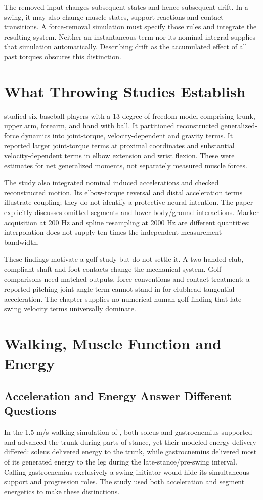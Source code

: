 The removed input changes subsequent states and hence subsequent drift. In a swing, it may also change muscle states, support reactions and contact transitions. A force-removal simulation must specify those rules and integrate the resulting system. Neither an instantaneous term nor its nominal integral supplies that simulation automatically. Describing drift as the accumulated effect of all past torques obscures this distinction.

\section{What Throwing Studies Establish}
\label{sec:throwing_lessons}
\citep{Hirashima2008kinetic} studied six baseball players with a 13-degree-of-freedom model comprising trunk, upper arm, forearm, and hand with ball. It partitioned reconstructed generalized-force dynamics into joint-torque, velocity-dependent and gravity terms. It reported larger joint-torque terms at proximal coordinates and substantial velocity-dependent terms in elbow extension and wrist flexion. These were estimates for net generalized moments, not separately measured muscle forces.

The study also integrated nominal induced accelerations and checked reconstructed motion. Its elbow-torque reversal and distal acceleration terms illustrate coupling; they do not identify a protective neural intention. The paper explicitly discusses omitted segments and lower-body/ground interactions. Marker acquisition at 200 Hz and spline resampling at 2000 Hz are different quantities: interpolation does not supply ten times the independent measurement bandwidth.

These findings motivate a golf study but do not settle it. A two-handed club, compliant shaft and foot contacts change the mechanical system. Golf comparisons need matched outputs, force conventions and contact treatment; a reported pitching joint-angle term cannot stand in for clubhead tangential acceleration. The chapter supplies no numerical human-golf finding that late-swing velocity terms universally dominate.

\section{Walking, Muscle Function and Energy}
\label{sec:walking_lessons}

\subsection{Acceleration and Energy Answer Different Questions}
In the 1.5 m/s walking simulation of \citep{Neptune2001}, both soleus and gastrocnemius supported and advanced the trunk during parts of stance, yet their modeled energy delivery differed: soleus delivered energy to the trunk, while gastrocnemius delivered most of its generated energy to the leg during the late-stance/pre-swing interval. Calling gastrocnemius exclusively a swing initiator would hide its simultaneous support and progression roles. The study used both acceleration and segment energetics to make these distinctions.

